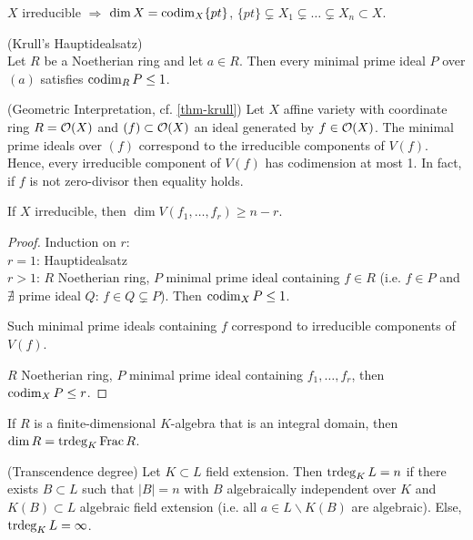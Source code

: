 \documentclass[a4paper,11pt]{article}
\begin{document}
{				\begin{remark}
					$X$ irreducible $\Longrightarrow$ $\dim X=\operatorname{codim}_X\{pt\}$, $\{pt\}\subsetneq X_1\subsetneq\dots\subsetneq X_n\subset X$.
				\end{remark}

				\begin{prop}
					(Krull's Hauptidealsatz)\\ Let $R$ be a Noetherian ring and let $a\in R$. Then every minimal prime ideal $P$ over $(a)$ satisfies $\operatorname{codim}_RP\le1$.
				\end{prop}

				\begin{remark}
					(Geometric Interpretation, cf. \autoref{thm-krull}) Let $X$ affine variety with coordinate ring $R=\mathcal{O}(X)$ and $(f)\subset\mathcal{O}(X)$ an ideal generated by $f\in\mathcal{O}(X)$. The minimal prime ideals over $(f)$ correspond to the irreducible components of $V(f)$. Hence, every irreducible component of $V(f)$ has codimension at most 1. In fact, if $f$ is not zero-divisor then equality holds. 
				\end{remark}

				\begin{cor}
					If $X$ irreducible, then $\dim V(f_1,\dots,f_r)\ge n-r$.
				\end{cor}
				\begin{proof}
					Induction on $r$:\\
					$r=1$: Hauptidealsatz\\
					$r>1$: $R$ Noetherian ring, $P$ minimal prime ideal containing $f\in R$ (i.e. $f\in P$ and $\nexists$ prime ideal $Q$: $f\in Q\subsetneq P$). Then $\operatorname{codim}_XP\le 1$.

					\begin{remark}
						Such minimal prime ideals containing $f$ correspond to irreducible components of $V(f)$.
					\end{remark}

					\noindent $R$ Noetherian ring, $P$ minimal prime ideal containing $f_1,\dots,f_r$, then $\operatorname{codim}_XP\le r$.
				\end{proof}

				\begin{prop}
					If $R$ is a finite-dimensional $K$-algebra that is an integral domain, then $\dim R=\operatorname{trdeg}_K\operatorname{Frac} R$.
				\end{prop}

				\begin{defi}(Transcendence degree)
					Let $K\subset L$ field extension. Then $\operatorname{trdeg}_KL=n$ if there exists $B\subset L$ such that $|B|=n$ with $B$ algebraically independent over $K$ and $K(B)\subset L$ algebraic field extension (i.e. all $a\in L\backslash K(B)$ are algebraic). Else, $\operatorname{trdeg}_KL=\infty$.
				\end{defi}

}
\end{document}
